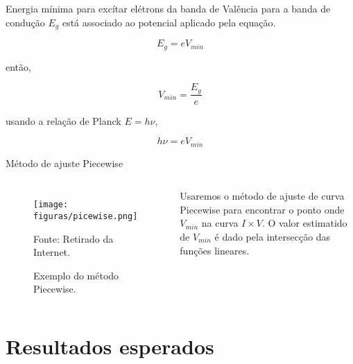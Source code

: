 \documentclass[aspectratio=169,12.5pt,xcolor=dvipsnames]{beamer}
\begin{document}
\begin{frame}{}

Energia mínima para excítar elétrons da banda de Valência para a banda de condução $E_g$ está associado ao potencial aplicado pela equação.

\begin{equation}
    E_g = e V_{min} 
\end{equation}

então,

\begin{equation}
    V_{min} = \frac{E_g}{e} 
\end{equation}

usando a relação de Planck $E = h\nu$,

\begin{equation}
    h\nu = eV_{min} 
\end{equation}

\end{frame}


\begin{frame}{Método de ajuste Piecewise}

    \begin{columns}[c]
        \begin{figure}
          \centering
          \caption{Exemplo do método Piecewise.}
          \texttt{[image: figuras/picewise.png]}\par
          {\scriptsize Fonte: Retirado da Internet.}
        \end{figure}


        Usaremos o método de ajuste de curva Piecewise para encontrar o ponto onde $V_{min}$ na curva $I\times V$. O valor
estimatido de $V_{min}$ é dado pela intersecção das funções lineares.
    
    \end{columns}


\end{frame}


\section{Resultados esperados}
\end{document}
